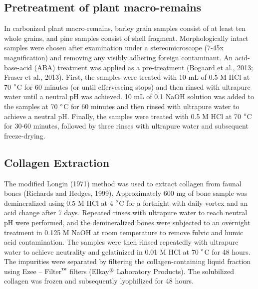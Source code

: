 \documentclass[review]{elsarticle} %
\begin{document}
\hypertarget{pretreatment-of-plant-macro-remains}{%
\subsection{Pretreatment of plant macro-remains}\label{pretreatment-of-plant-macro-remains}}

In carbonized plant macro-remains, barley grain samples consist of at least ten whole grains, and pine samples consist of shell fragment. Morphologically intact samples were chosen after examination under a stereomicroscope (7-45x magnification) and removing any visibly adhering foreign contaminant. An acid-base-acid (ABA) treatment was applied as a pre-treatment (Bogaard et al., 2013; Fraser et al., 2013). First, the samples were treated with 10 mL of 0.5 M HCl at 70 \(\text{\textdegree}\)C for 60 minutes (or until effervescing stops) and then rinsed with ultrapure water until a neutral pH was achieved. 10 mL of 0.1 NaOH solution was added to the samples at 70 \(\text{\textdegree}\)C for 60 minutes and then rinsed with ultrapure water to achieve a neutral pH. Finally, the samples were treated with 0.5 M HCl at 70 \(\text{\textdegree}\)C for 30-60 minutes, followed by three rinses with ultrapure water and subsequent freeze-drying.

\hypertarget{collagen-extraction}{%
\subsection{Collagen Extraction}\label{collagen-extraction}}

The modified Longin (1971) method was used to extract collagen from faunal bones (Richards and Hedges, 1999). Approximately 600 mg of bone sample was demineralized using 0.5 M HCl at 4 \(\text{\textdegree}\)C for a fortnight with daily vortex and an acid change after 7 days. Repeated rinses with ultrapure water to reach neutral pH were performed, and the demineralized bones were subjected to an overnight treatment in 0.125 M NaOH at room temperature to remove fulvic and humic acid contamination. The samples were then rinsed repeatedly with ultrapure water to achieve neutrality and gelatinized in 0.01 M HCl at 70 \(\text{\textdegree}\)C for 48 hours. The impurities were separated by filtering the collagen-containing liquid fraction using Ezee -- Filter\(^\text{\texttrademark}\) filters (Elkay\(^\text{\textregistered}\) Laboratory Products). The solubilized collagen was frozen and subsequently lyophilized for 48 hours.
\end{document}
